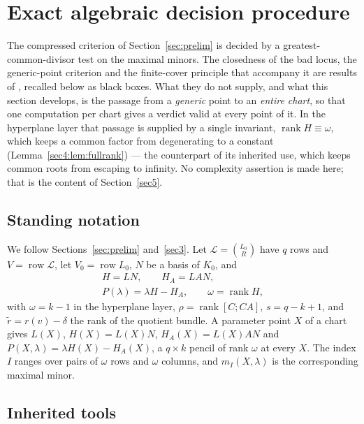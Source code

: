 \documentclass[journal]{IEEEtran}
\theoremstyle{plainn}
\theoremstyle{remark}
\newcommand{\row}{\operatorname{row}}
\newcommand{\rank}{\operatorname{rank}}
\begin{document}
\section{Exact algebraic decision procedure}
\label{sec4}\label{sec:decision}

The compressed criterion of Section~\ref{sec:prelim} is decided by a greatest-common-divisor test on
the maximal minors. The closedness of the bad locus, the generic-point criterion and the finite-cover
principle that accompany it are results of \cite{companion1}, recalled below as black boxes. What they
do not supply, and what this section develops, is the passage from a \emph{generic} point to an
\emph{entire chart}, so that one computation per chart gives a verdict valid at every point of it. In
the hyperplane layer that passage is supplied by a single invariant, $\rank H\equiv\omega$, which keeps
a common factor from degenerating to a constant (Lemma~\ref{sec4:lem:fullrank}) --- the counterpart of
its inherited use, which keeps common roots from escaping to infinity. No complexity assertion is made
here; that is the content of Section~\ref{sec5}.

\subsection{Standing notation}
\label{sec4:notation}

We follow Sections~\ref{sec:prelim} and~\ref{sec3}. Let $\mathcal L=\binom{L_0}{R}$ have $q$ rows and
$V=\row\mathcal L$, let $V_0=\row L_0$, $N$ be a basis of $K_0$, and
\[
\begin{gathered}
H=LN,\qquad H_A=LAN,\\
P(\lambda)=\lambda H-H_A,\qquad \omega=\rank H ,
\end{gathered}
\]
with $\omega=k-1$ in the hyperplane layer, $\rho=\rank[C;CA]$, $s=q-k+1$, and
$\widetilde r=r(v)-\delta$ the rank of the quotient bundle. A parameter point $X$ of a chart gives
$L(X)$, $H(X)=L(X)N$, $H_A(X)=L(X)AN$ and $P(X,\lambda)=\lambda H(X)-H_A(X)$, a $q\times k$ pencil of
rank $\omega$ at every $X$. The index $I$ ranges over pairs of $\omega$ rows and $\omega$ columns, and
$m_I(X,\lambda)$ is the corresponding maximal minor.

\subsection{Inherited tools}
\label{sec4:inherited}
\end{document}
